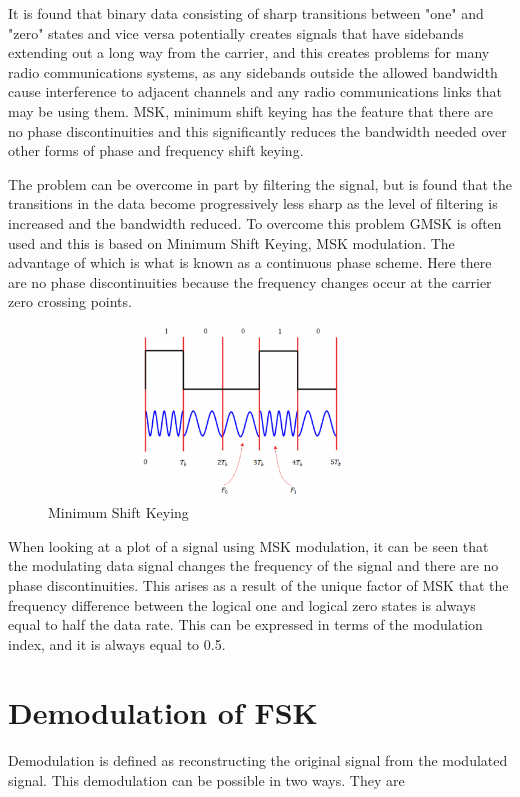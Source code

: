 \documentclass{report}
\begin{document}
	It is found that binary data consisting of sharp transitions between "one" and "zero" states and vice versa potentially creates signals that have sidebands extending out a long way from the carrier, and this creates problems for many radio communications systems, as any sidebands outside the allowed bandwidth cause interference to adjacent channels and any radio communications links that may be using them.	
	MSK, minimum shift keying has the feature that there are no phase discontinuities and this significantly reduces the bandwidth needed over other forms of phase and frequency shift keying.\bigskip 
	
	The problem can be overcome in part by filtering the signal, but is found that the transitions in the data become progressively less sharp as the level of filtering is increased and the bandwidth reduced. To overcome this problem GMSK is often used and this is based on Minimum Shift Keying, MSK modulation. The advantage of which is what is known as a continuous phase scheme. Here there are no phase discontinuities because the frequency changes occur at the carrier zero crossing points.\\
	
	\begin{figure}[H]
		\centering
		\includegraphics[width=\linewidth]{images/msk.png}
		\caption{Minimum Shift Keying}
		\label{fig:}
	\end{figure}
	
	When looking at a plot of a signal using MSK modulation, it can be seen that the modulating data signal changes the frequency of the signal and there are no phase discontinuities. This arises as a result of the unique factor of MSK that the frequency difference between the logical one and logical zero states is always equal to half the data rate. This can be expressed in terms of the modulation index, and it is always equal to 0.5.
	
	\newpage
	
	\section{Demodulation of FSK}
	\bigskip 
	Demodulation is defined as reconstructing the original signal from the modulated signal. This demodulation can be possible in two ways. They are
	
\end{document}
